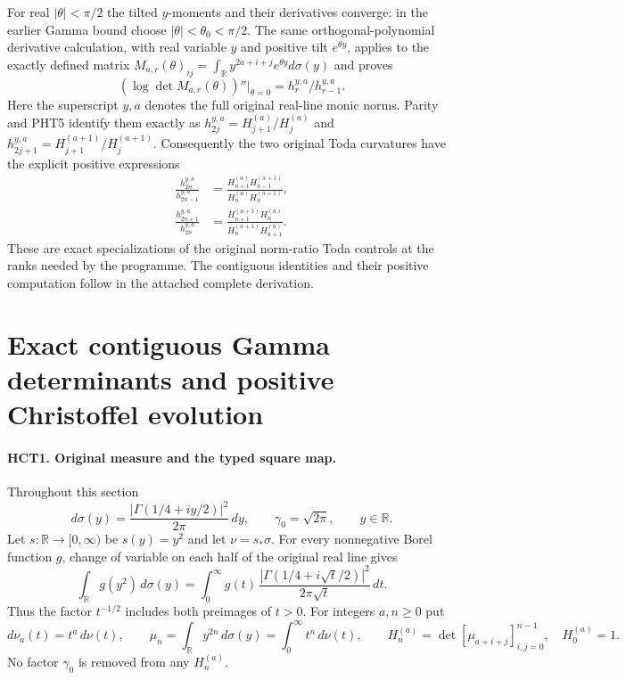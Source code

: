 \documentclass[11pt,a4paper]{article}
\begin{document}
For real $|\theta|<\pi/2$ the tilted $y$-moments and their
derivatives converge: in the earlier Gamma bound choose
$|\theta|<\theta_0<\pi/2$. The same orthogonal-polynomial
derivative calculation, with real variable $y$ and positive
tilt $e^{\theta y}$, applies to the exactly defined matrix
$M_{a,r}(\theta)_{ij}=\int_{\mathbb R}y^{2a+i+j}
e^{\theta y}d\sigma(y)$ and proves
\[
 (\log\det M_{a,r}(\theta))''\big|_{\theta=0}
   =h_r^{y,a}/h_{r-1}^{y,a}.
\tag{PHT18}
\]
Here the superscript $y,a$ denotes the full original real-line
monic norms. Parity and PHT5 identify them exactly as
$h_{2j}^{y,a}=H_{j+1}^{(a)}/H_j^{(a)}$ and
$h_{2j+1}^{y,a}=H_{j+1}^{(a+1)}/H_j^{(a+1)}$.
Consequently the two original Toda curvatures have the explicit
positive expressions
\[
\begin{aligned}
 \frac{h_{2n}^{y,a}}{h_{2n-1}^{y,a}}
 &=\frac{H_{n+1}^{(a)}H_{n-1}^{(a+1)}}
        {H_n^{(a)}H_n^{(a+1)}},\\
 \frac{h_{2n+1}^{y,a}}{h_{2n}^{y,a}}
 &=\frac{H_{n+1}^{(a+1)}H_n^{(a)}}
        {H_n^{(a+1)}H_{n+1}^{(a)}}.
\end{aligned}\tag{PHT19}
\]
These are exact specializations of the original norm-ratio
Toda controls at the ranks needed by the programme. The
contiguous identities and their positive computation follow
in the attached complete derivation.


\section{Exact contiguous Gamma determinants and positive Christoffel evolution}
\label{sec:HCT}

\paragraph{HCT1. Original measure and the typed square map.}
Throughout this section
\[
 d\sigma(y)=\frac{|\Gamma(1/4+iy/2)|^2}{2\pi}\,dy,
 \qquad \gamma_0=\sqrt{2\pi},\qquad y\in\mathbb R.
\]
Let $s:\mathbb R\longrightarrow[0,\infty)$ be $s(y)=y^2$ and
let $\nu=s_*\sigma$. For every nonnegative Borel function $g$,
change of variable on each half of the original real line gives
\begin{equation}\tag{HCT1}
 \int_{\mathbb R}g(y^2)\,d\sigma(y)
 =\int_0^\infty g(t)\,
 \frac{|\Gamma(1/4+i\sqrt t/2)|^2}{2\pi\sqrt t}\,dt.
\end{equation}
Thus the factor $t^{-1/2}$ includes both preimages of $t>0$.
For integers $a,n\geq0$ put
\[
 d\nu_a(t)=t^a\,d\nu(t),\qquad
 \mu_n=\int_{\mathbb R}y^{2n}\,d\sigma(y)=\int_0^\infty t^n\,d\nu(t),
 \qquad H_n^{(a)}=\det[\mu_{a+i+j}]_{i,j=0}^{n-1},\quad H_0^{(a)}=1.
\]
No factor $\gamma_0$ is removed from any $H_n^{(a)}$.
\end{document}
